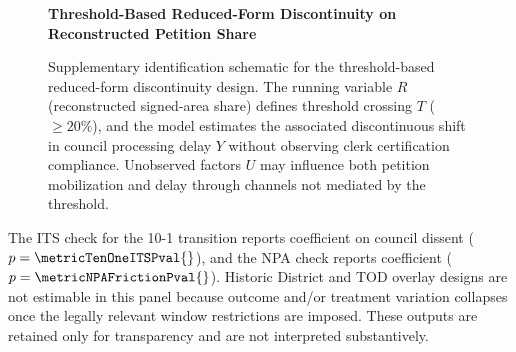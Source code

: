 \documentclass[11pt, letterpaper, oneside]{article}
\begin{document}
\begin{figure}[H]
\centering
\vspace{0.2cm}
\textbf{\small Threshold-Based Reduced-Form Discontinuity on Reconstructed Petition Share}\par\vspace{0.3cm}
\caption[Identification Diagram: Threshold-Based Reduced-Form Discontinuity]{Supplementary identification schematic for the threshold-based reduced-form discontinuity design. The running variable $R$ (reconstructed signed-area share) defines threshold crossing $T$ ($\geq 20\%$), and the model estimates the associated discontinuous shift in council processing delay $Y$ without observing clerk certification compliance. Unobserved factors $U$ may influence both petition mobilization and delay through channels not mediated by the threshold.}
\label{fig:causal_dag_appendix}
\end{figure}

The ITS check for the 10-1 transition reports coefficient \metricTenOneITSCoeff{} on council dissent ($p=\metricTenOneITSPval{}$), and the NPA check reports coefficient \metricNPAFrictionCoeff{} ($p=\metricNPAFrictionPval{}$). Historic District and TOD overlay designs are not estimable in this panel because outcome and/or treatment variation collapses once the legally relevant window restrictions are imposed. These outputs are retained only for transparency and are not interpreted substantively.
\end{document}
